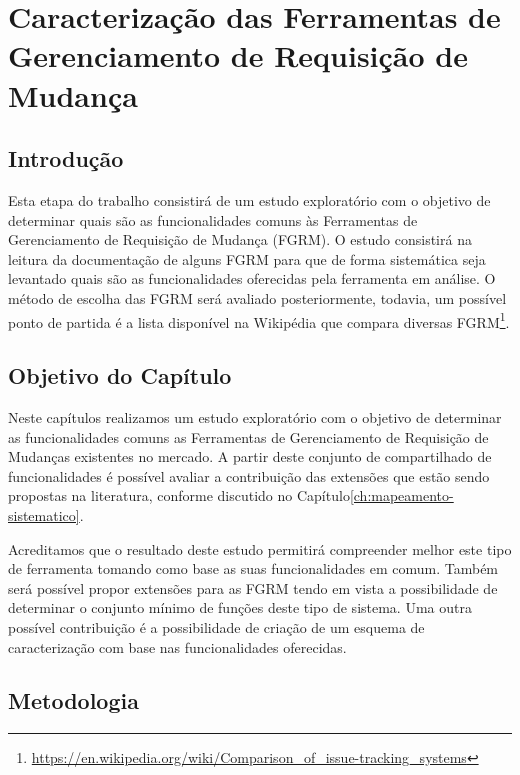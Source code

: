 \chapter{Caracterização das Ferramentas de Gerenciamento de Requisição de Mudança}
\label{ch:caracterizacao}


\section{Introdução}

Esta etapa do trabalho consistirá de um estudo exploratório com o objetivo de determinar quais são as funcionalidades comuns às Ferramentas de Gerenciamento de Requisição de Mudança (FGRM). O estudo consistirá na leitura da documentação de alguns FGRM para que de forma sistemática seja levantado quais são as funcionalidades oferecidas pela ferramenta em análise. O método de escolha das FGRM será avaliado posteriormente, todavia, um possível ponto de partida é a lista disponível na Wikipédia que compara diversas FGRM\footnote{\url{https://en.wikipedia.org/wiki/Comparison_of_issue-tracking_systems}}.

\section{Objetivo do Capítulo}
\label{sec:objetivo_do_capítulo}

Neste capítulos realizamos um estudo exploratório com o objetivo de determinar as
funcionalidades comuns as Ferramentas de Gerenciamento de Requisição de Mudanças existentes no
mercado. A partir deste conjunto de compartilhado de funcionalidades é possível avaliar a
contribuição das extensões que estão sendo propostas na literatura, conforme discutido no
Capítulo\ref{ch:mapeamento-sistematico}.

Acreditamos que o resultado deste estudo permitirá compreender melhor este tipo de ferramenta tomando como base as
suas funcionalidades em comum. Também será possível propor extensões para as FGRM tendo em vista a
possibilidade de determinar o conjunto mínimo de funções deste tipo de sistema. Uma outra possível
contribuição é a possibilidade de criação de um esquema de caracterização com base nas funcionalidades oferecidas.

\section{Metodologia}
\label{sec:metodologia}

